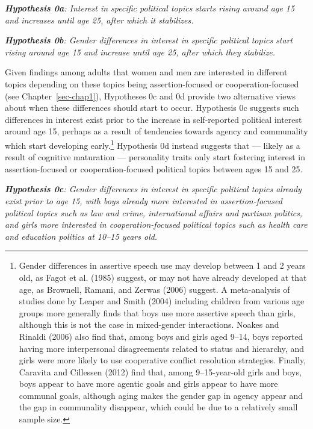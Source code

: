 \documentclass[
  letterpaper,
  DIV=11,
  numbers=noendperiod]{scrreprt}
\begin{document}
\emph{\textbf{Hypothesis 0a}: Interest in specific political topics
starts rising around age 15 and increases until age 25, after which it
stabilizes.}

\emph{\textbf{Hypothesis 0b}: Gender differences in interest in specific
political topics start rising around age 15 and increase until age 25,
after which they stabilize.}

Given findings among adults that women and men are interested in
different topics depending on these topics being assertion-focused or
cooperation-focused (see Chapter~\ref{sec-chap1}), Hypotheses 0c and 0d
provide two alternative views about when these differences should start
to occur. Hypothesis 0c suggests such differences in interest exist
prior to the increase in self-reported political interest around age 15,
perhaps as a result of tendencies towards agency and communality which
start developing early.\footnote{Gender differences in assertive speech
  use may develop between 1 and 2 years old, as Fagot et al. (1985)
  suggest, or may not have already developed at that age, as Brownell,
  Ramani, and Zerwas (2006) suggest. A meta-analysis of studies done by
  Leaper and Smith (2004) including children from various age groups
  more generally finds that boys use more assertive speech than girls,
  although this is not the case in mixed-gender interactions. Noakes and
  Rinaldi (2006) also find that, among boys and girls aged 9--14, boys
  reported having more interpersonal disagreements related to status and
  hierarchy, and girls were more likely to use cooperative conflict
  resolution strategies. Finally, Caravita and Cillessen (2012) find
  that, among 9--15-year-old girls and boys, boys appear to have more
  agentic goals and girls appear to have more communal goals, although
  aging makes the gender gap in agency appear and the gap in communality
  disappear, which could be due to a relatively small sample size.}
Hypothesis 0d instead suggests that --- likely as a result of cognitive
maturation --- personality traits only start fostering interest in
assertion-focused or cooperation-focused political topics between ages
15 and 25.

\emph{\textbf{Hypothesis 0c}: Gender differences in interest in specific
political topics already exist prior to age 15, with boys already more
interested in assertion-focused political topics such as law and crime,
international affairs and partisan politics, and girls more interested
in cooperation-focused political topics such as health care and
education politics at 10--15 years old.}
\end{document}
